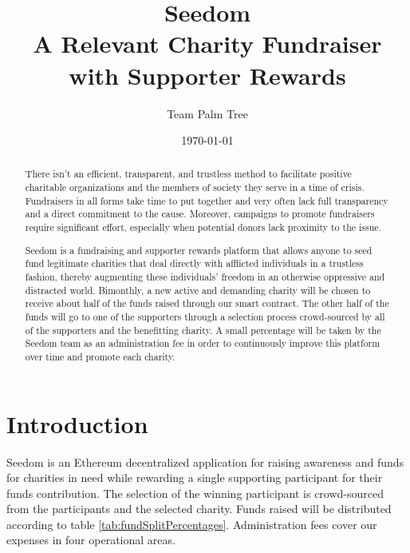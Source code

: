 \documentclass[11pt]{article}
\begin{document}
\title{%
\Huge Seedom \\[4mm]
\large A Relevant Charity Fundraiser \\[1mm]
with Supporter Rewards}
\author{Team Palm Tree}
\date{\today}
\maketitle

\begin{abstract}

There isn't an efficient, transparent, and trustless method to facilitate positive charitable organizations and the members of society they serve in a time of crisis. Fundraisers in all forms take time to put together and very often lack full transparency and a direct commitment to the cause. Moreover, campaigns to promote fundraisers require significant effort, especially when potential donors lack proximity to the issue.

Seedom is a fundraising and supporter rewards platform that allows anyone to seed fund legitimate charities that deal directly with afflicted individuals in a trustless fashion, thereby augmenting these individuals' freedom in an otherwise oppressive and distracted world. Bimonthly, a new active and demanding charity will be chosen to receive about half of the funds raised through our smart contract. The other half of the funds will go to one of the supporters through a selection process crowd-sourced by all of the supporters and the benefitting charity. A small percentage will be taken by the Seedom team as an administration fee in order to continuously improve this platform over time and promote each charity.

\end{abstract}
\pagebreak

\tableofcontents
\pagebreak

\section{Introduction}

Seedom is an Ethereum decentralized application for raising awareness and funds for charities in need while rewarding a single supporting participant for their funds contribution. The selection of the winning participant is crowd-sourced from the participants and the selected charity. Funds raised will be distributed according to table \ref{tab:fundSplitPercentages}. Administration fees cover our expenses in four operational areas.
\end{document}
